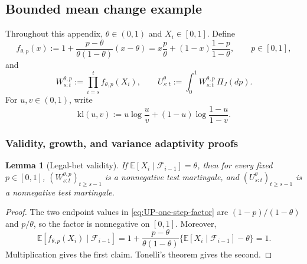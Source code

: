 \documentclass[12pt]{article}
\theoremstyle{spaced}
\newtheorem{lemma}[lemma]{Lemma}
\theoremstyle{remark}
\newcommand{\E}{\mathbb E}
\newcommand{\kl}{\mathrm{kl}}
\begin{document}
\subsection{Bounded mean change example}
\label{app:bounded-UP}
Throughout this appendix, $\theta\in(0,1)$ and
$X_i\in[0,1]$.  Define
\begin{equation}
\label{eq:UP-one-step-factor}
 f_{\theta,p}(x)
 :=1+\frac{p-\theta}{\theta(1-\theta)}(x-\theta)
 =x\frac p\theta+(1-x)\frac{1-p}{1-\theta},
 \qquad p\in[0,1],
\end{equation}
and
\[
 W_{s:t}^{\theta,p}:=\prod_{i=s}^t f_{\theta,p}(X_i),
 \qquad
 U_{s:t}^{\theta}:=\int_0^1W_{s:t}^{\theta,p}\,\Pi_J(dp).
\]
For $u,v\in(0,1)$, write
\begin{equation}
\label{eq:binary-kl}
    \kl(u,v)
  :=u\log\frac uv+(1-u)\log\frac{1-u}{1-v}.
\end{equation}

\subsubsection{Validity, growth, and variance adaptivity proofs}
\label{app:prop-bddmean}
\begin{lemma}[Legal-bet validity]
\label{lem:UP-validity}
If $\E[X_i\mid\mathcal F_{i-1}]=\theta$, then for every fixed $p\in[0,1]$,
$(W_{s:t}^{\theta,p})_{t\ge s-1}$ is a nonnegative test martingale, and
$(U_{s:t}^{\theta})_{t\ge s-1}$ is a nonnegative test martingale.
\end{lemma}
\begin{proof}
The two endpoint values in \eqref{eq:UP-one-step-factor} are
$(1-p)/(1-\theta)$ and $p/\theta$, so the factor is nonnegative on
$[0,1]$.  Moreover,
\[
 \E[f_{\theta,p}(X_i)\mid\mathcal F_{i-1}]
 =1+\frac{p-\theta}{\theta(1-\theta)}
   \{\E[X_i\mid\mathcal F_{i-1}]-\theta\}=1.
\]
Multiplication gives the first claim.  Tonelli's theorem gives the second.
\end{proof}
\end{document}
